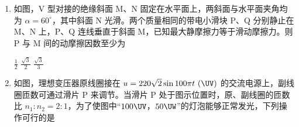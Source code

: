 \documentclass[\gkver]{gaokaozhenti}
\begin{document}
\begin{enumerate}
{	可得

	$a = 5\Umsq$

	而 P 物体将有相同的加速度向右加速而受滑动摩擦力，对 P 由牛顿第二定律

	$T_{2} + F - \mu m_{P}g = m_{P}a$

	解得

	$F = 4\UN$

	故选 A。
}

\item
如图，V 型对接的绝缘斜面 M、N 固定在水平面上，两斜面与水平面夹角均为 $\alpha = 60^\circ$，其中斜面 N 光滑。两个质量相同的带电小滑块 P、Q 分别静止在 M、N 上，P、Q 连线垂直于斜面 M，已知最大静摩擦力等于滑动摩擦力。则 P 与 M 间的动摩擦因数至少为


{$\frac{1}{2}$}
{$\frac{\sqrt{3}}{2}$}
{$\frac{\sqrt{3}}{3}$}


\item
如图，理想变压器原线圈接在 $u = 220\sqrt{2}\sin 100\pi t\ (\UV)$ 的交流电源上，副线圈匝数可通过滑片 P 来调节。当滑片 P 处于图示位置时，原、副线圈的匝数比 $n_{1}:n_{2} = 2:1$，为了使图中“$100\UV$，$50\UW$”的灯泡能够正常发光，下列操作可行的是


\end{enumerate}
\end{document}
